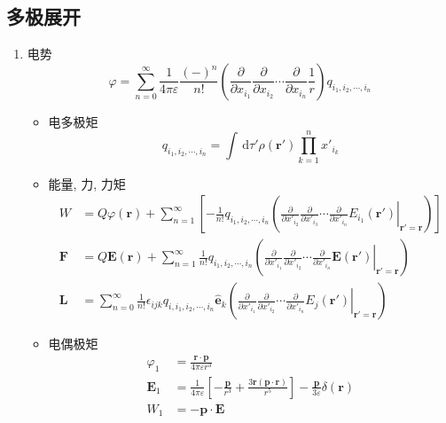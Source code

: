 \documentclass[12pt,a4paper]{article}%
\numberwithin{equation}{section}%
\renewcommand*{\vec}[1]{\bm{#1}}%
\newcommand{\dif}{\,\mathrm d}
\newcommand*{\uvec}[1]{\hat{\vec{#1}}}
\begin{document}
\subsection{多极展开} %
\label{sub:multipolar_expansion}
\begin{enumerate}
    \item 电势
    \begin{equation}\label{equ:multipole_for_phi}
        \varphi = \sum_{n=0}^\infty \frac 1{4\pi\varepsilon}\frac{(-)^n}{n!}\left(\frac{\partial}{\partial x_{i_1}}\frac{\partial}{\partial x_{i_2}}\cdots\frac{\partial}{\partial x_{i_n}}\frac 1 r\right)q_{i_1,i_2,\cdots,i_n}
    \end{equation} 
    \begin{itemize}
        \item 电多极矩
        \begin{equation}
            q_{i_1,i_2,\cdots,i_n} = \int\dif \tau' \rho(\vec r')\prod_{k=1}^n x'_{i_k}
        \end{equation}
        \item 能量, 力, 力矩
        \begin{align}
            W &= Q\varphi(\vec r) + \sum_{n=1}^\infty \left[-\frac 1{n!}q_{i_1,i_2,\cdots,i_n}\left(\left.\frac{\partial}{\partial x'_{i_2}}\frac{\partial}{\partial x'_{i_3}}\cdots\frac{\partial}{\partial x'_{i_n}} E_{i_1}(\vec r')\right|_{\vec r' = \vec r}\right)\right] \\
            \vec F &= Q\vec E(\vec r) + \sum_{n=1}^\infty \frac 1{n!}q_{i_1,i_2,\cdots,i_n}\left(\left.\frac{\partial}{\partial x'_{i_1}}\frac{\partial}{\partial x'_{i_2}}\cdots\frac{\partial}{\partial x'_{i_n}} \vec E(\vec r')\right|_{\vec r' = \vec r}\right) \\
            \vec L &= \sum_{n=0}^\infty \frac 1{n!} \epsilon_{ijk}q_{i,i_1,i_2,\cdots,i_n}\uvec e_k \left(\left.\frac{\partial}{\partial x'_{i_1}}\frac{\partial}{\partial x'_{i_2}}\cdots\frac{\partial}{\partial x'_{i_n}} E_j(\vec r')\right|_{\vec r' = \vec r}\right) 
        \end{align}
        \item 电偶极矩 
        \begin{align}
            \varphi_1 &= \frac{\vec r\cdot\vec p}{4\pi\varepsilon r^3} \\
            \vec E_1 &= \frac 1{4\pi\varepsilon}\left[-\frac{\vec p}{r^3} + \frac{3\vec r(\vec p\cdot\vec r)}{r^5}\right] - \frac{\vec p}{3\varepsilon}\delta(\vec r) \\
            W_1 &= -\vec p\cdot\vec E

\end{align}
\end{itemize}
\end{enumerate}
\end{document}
